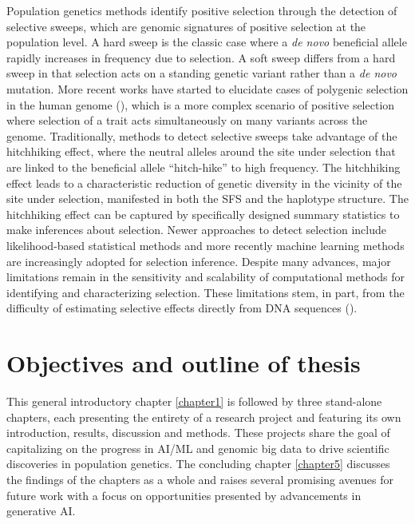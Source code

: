 Population genetics methods identify positive selection through the detection of selective sweeps, which are genomic signatures of positive selection at the population level. A hard sweep is the classic case where a \textit{de novo} beneficial allele rapidly increases in frequency due to selection. A soft sweep differs from a hard sweep in that selection acts on a standing genetic variant rather than a \textit{de novo} mutation. More recent works have started to elucidate cases of polygenic selection in the human genome (\cite{berg2014population,racimo2018detecting,edge2019reconstructing}), which is a more complex scenario of positive selection where selection of a trait acts simultaneously on many variants across the genome. Traditionally, methods to detect selective sweeps take advantage of the hitchhiking effect, where the neutral alleles around the site under selection that are linked to the beneficial allele “hitch-hike” to high frequency. The hitchhiking effect leads to a characteristic reduction of genetic diversity in the vicinity of the site under selection, manifested in both the \ac{SFS} and the haplotype structure. The hitchhiking effect can be captured by specifically designed summary statistics to make inferences about selection. Newer approaches to detect selection include likelihood-based statistical methods and more recently machine learning methods are increasingly adopted for selection inference. Despite many advances, major limitations remain in the sensitivity and scalability of computational methods for identifying and characterizing selection. These limitations stem, in part, from the difficulty of estimating selective effects directly from DNA sequences (\cite{hejase_summary_2020}).

\section{Objectives and outline of thesis}

This general introductory chapter \ref{chapter1} is followed by three stand-alone chapters, each presenting the entirety of a research project and featuring its own introduction, results, discussion and methods. These projects share the goal of capitalizing on the progress in \ac{AI}/\ac{ML} and genomic big data to drive scientific discoveries in population genetics. The concluding chapter \ref{chapter5} discusses the findings of the chapters as a whole and raises several promising avenues for future work with a focus on opportunities presented by advancements in generative \ac{AI}.

